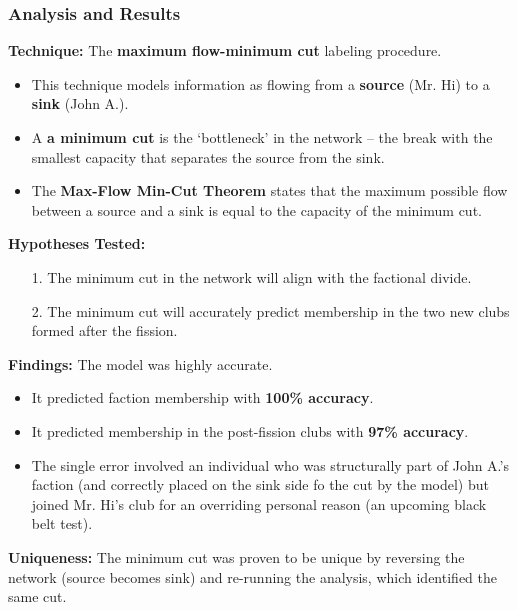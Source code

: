 \documentclass{article}
\begin{document}
    \subsubsection{Analysis and Results}

    \noindent \textbf{Technique:} The \textbf{maximum flow-minimum cut}
labeling procedure.
    \begin{itemize}
        \item This technique models information as flowing from a
        \textbf{source} (Mr. Hi) to a \textbf{sink} (John A.).
        \item A \textbf{a minimum cut} is the `bottleneck' in the network --
        the break with the smallest capacity that separates the source from
        the sink.
        \item The \textbf{Max-Flow Min-Cut Theorem} states that the maximum
        possible flow between a source and a sink is equal to the capacity
        of the minimum cut.
    \end{itemize}

    \noindent \textbf{Hypotheses Tested:}
    \begin{itemize}
        \item [1.] The minimum cut in the network will align with the
        factional divide.
        \item[2.] The minimum cut will accurately predict membership in the
        two new clubs formed after the fission.
    \end{itemize}

    \noindent \textbf{Findings:} The model was highly accurate.
    \begin{itemize}
        \item It predicted faction membership with \textbf{100\% accuracy}.
        \item It predicted membership in the post-fission clubs with \textbf{
        97\% accuracy}.
        \item The single error involved an individual who was structurally
        part of John A.'s faction (and correctly placed on the sink side fo
        the cut by the model) but joined Mr. Hi's club for an overriding
        personal reason (an upcoming black belt test).
    \end{itemize}

    \noindent \textbf{Uniqueness:} The minimum cut was proven to be unique
by reversing the network (source becomes sink) and re-running the analysis,
which identified the same cut.
\end{document}
